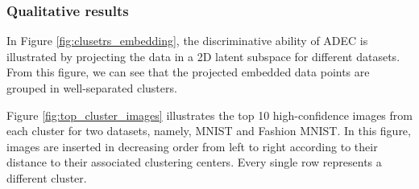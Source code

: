 \documentclass{article}
\begin{document}
\subsubsection{Qualitative results}

\begin{figure*}[ht]
\vskip 0.2in

\centering
    \caption{2D embedding subspace visualization to show the discriminative ability of ADEC.}
\label{fig:clusetrs_embedding}
\end{figure*}

In Figure \ref{fig:clusetrs_embedding}, the discriminative ability of ADEC is illustrated by projecting the data in a 2D latent subspace for different datasets. From this figure, we can see that the projected embedded data points are grouped in well-separated clusters.

\begin{figure*}[ht]
\vskip 0.2in
\centering
    \caption{Each row shows the top 10 high-confidence images from each cluster.}
\label{fig:top_cluster_images}
\end{figure*}

Figure \ref{fig:top_cluster_images} illustrates the top 10 high-confidence images from each cluster for two datasets, namely, MNIST and Fashion MNIST. In this figure, images are inserted in decreasing order from left to right according to their distance to their associated clustering centers. Every single row represents a different cluster.
\end{document}

